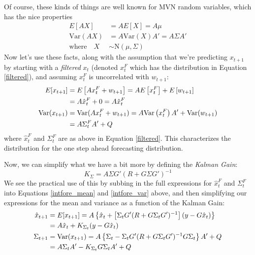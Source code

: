 \documentclass[a4paper,12pt]{article}
\begin{document}
Of course, these kinds of things are well known for  
MVN random variables, which has the nice properties
\begin{align*}
    E[AX] &= A E[X] = A \mu \\
    \text{Var}(AX) &= A \text{Var}(X) A' = A\Sigma A' \\
    \text{where} \quad X &\sim \text{N}(\mu, \Sigma)
\end{align*}
Now let's use these facts, along with the assumption
that we're predicting $x_{t+1}$ by starting with a 
\emph{filtered} $x_t$ (denoted $x^F_t$ which has the 
distribution in Equation \ref{filtered}), and 
assuming $x^F_t$ is uncorrelated with $w_{t+1}$:
\begin{align}
    E[x_{t+1}] &= E\left[A{x}^F_{t} + w_{t+1} \right] 
        = AE\left[{x}^F_{t}\right] + E\left[w_{t+1} 
            \right] \notag\\
        &= A \hat{x}^F_{t} + 0 = A \hat{x}^{F}_t
            \label{intfore_mean}\\
    \text{Var}({x}_{t+1}) &= 
        \text{Var}(A{x}^F_{t} + w_{t+1}) 
        = A\text{Var}\left({x}^F_{t}\right)A' 
            +\text{Var}(w_{t+1})\notag \\
        &= A\Sigma^F_t A' + Q \label{intfore_var}
\end{align}
where $\hat{x}^F_t$ and $\Sigma_t^F$ are as above in Equation 
\ref{filtered}. This characterizes the distribution for the
one step ahead forecasting distribution.

\newpage
Now, we can simplify what we have a bit more by defining 
the \emph{Kalman Gain}:
\begin{equation}
    \label{kalgain}
    K_\Sigma = A\Sigma G' (R + G\Sigma G')^{-1}
\end{equation}
We see the practical use of this by subbing in the full
expressions for $\hat{x}_t^F$ and $\Sigma_t^F$ into Equations 
\ref{intfore_mean} and \ref{intfore_var} above,
and then simplifying our expressions for the
mean and variance as a function of the Kalman Gain:
\begin{align}
    \hat{x}_{t+1} &= E[x_{t+1}] = 
        A\left\{ \hat{x}_t
	    + \left[\Sigma_t G' (R + G \Sigma_t G')^{-1}  \right]
        \left( y - G \hat{x}_t \right) \right\} \notag \\
        &= A\hat{x}_t + K_{\Sigma_t} (y - G \hat{x}_t) 
        \label{foremean} \\
    \Sigma_{t+1} &= \text{Var}(x_{t+1}) = 
        A \left\{ \Sigma_t - \Sigma_t G'(R 
	    + G\Sigma_t G')^{-1}
        G\Sigma_t \right\} A' + Q \notag \\
    &= A\Sigma_t A' - K_{\Sigma_t} G \Sigma_t A' + Q
        \label{forevar}
\end{align}
\end{document}
